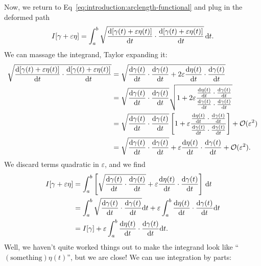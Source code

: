 Now, we return to Eq~\eqref{eq:introduction:arclength-functional} and
plug in the deformed path
\begin{equation}
  I[\gamma + \varepsilon\eta]
  = \int^{b}_{a}\sqrt{\frac{\mathrm{d}[\gamma(t)+ \varepsilon\eta(t)]}{\mathrm{d} t}\cdot\frac{\mathrm{d}[\gamma(t)+ \varepsilon\eta(t)]}{\mathrm{d} t}}\,\mathrm{d} t.
\end{equation}
We can massage the integrand, Taylor expanding it:
\begin{subequations}
  \begin{align}
\sqrt{\frac{\mathrm{d}[\gamma(t)+ \varepsilon\eta(t)]}{\mathrm{d} t}\cdot\frac{\mathrm{d}[\gamma(t)+ \varepsilon\eta(t)]}{\mathrm{d} t}}
&= \sqrt{\frac{\mathrm{d}\gamma(t)}{\mathrm{d} t}\cdot\frac{\mathrm{d}\gamma(t)}{\mathrm{d} t} + 2\varepsilon \frac{\mathrm{d}\eta(t)}{\mathrm{d} t}\cdot\frac{\mathrm{d}\gamma(t)}{\mathrm{d} t}}\\
&= \sqrt{\frac{\mathrm{d}\gamma(t)}{\mathrm{d} t}\cdot\frac{\mathrm{d}\gamma(t)}{\mathrm{d} t}}\sqrt{1 + 2\varepsilon \frac{\frac{\mathrm{d}\eta(t)}{\mathrm{d} t}\cdot\frac{\mathrm{d}\gamma(t)}{\mathrm{d} t}}{\frac{\mathrm{d}\gamma(t)}{\mathrm{d} t}\cdot\frac{\mathrm{d}\gamma(t)}{\mathrm{d} t}}}\\
&= \sqrt{\frac{\mathrm{d}\gamma(t)}{\mathrm{d} t}\cdot\frac{\mathrm{d}\gamma(t)}{\mathrm{d}
    t}}\left[1 + \varepsilon \frac{\frac{\mathrm{d}\eta(t)}{\mathrm{d} t}\cdot\frac{\mathrm{d}\gamma(t)}{\mathrm{d} t}}{\frac{\mathrm{d}\gamma(t)}{\mathrm{d} t}\cdot\frac{\mathrm{d}\gamma(t)}{\mathrm{d} t}}\right]
+\mathcal{O}(\varepsilon^{2})\\
&= \sqrt{\frac{\mathrm{d}\gamma(t)}{\mathrm{d} t}\cdot\frac{\mathrm{d}\gamma(t)}{\mathrm{d} t}} + \varepsilon \frac{\mathrm{d}\eta(t)}{\mathrm{d} t}\cdot\frac{\mathrm{d}\gamma(t)}{\mathrm{d} t} +\mathcal{O}(\varepsilon^{2}).
  \end{align}
\end{subequations}
We discard terms quadratic in $\varepsilon$, and we find
\begin{subequations}
  \begin{align}
I[\gamma + \varepsilon\eta] &= \int^{b}_{a} \left[\sqrt{\frac{\mathrm{d}\gamma(t)}{\mathrm{d} t}\cdot\frac{\mathrm{d}\gamma(t)}{\mathrm{d} t}} + \varepsilon \frac{\mathrm{d}\eta(t)}{\mathrm{d} t}\cdot\frac{\mathrm{d}\gamma(t)}{\mathrm{d} t}\right]\,
\mathrm{d} t\\
&= \int^{b}_{a} \sqrt{\frac{\mathrm{d}\gamma(t)}{\mathrm{d} t}\cdot\frac{\mathrm{d}\gamma(t)}{\mathrm{d} t}}\mathrm{d} t +
\varepsilon \int^{b}_{a} \frac{\mathrm{d}\eta(t)}{\mathrm{d} t}\cdot\frac{\mathrm{d}\gamma(t)}{\mathrm{d} t}\mathrm{d} t\\
&= I[\gamma] + \varepsilon \int^{b}_{a} \frac{\mathrm{d}\eta(t)}{\mathrm{d} t}\cdot\frac{\mathrm{d}\gamma(t)}{\mathrm{d} t}\mathrm{d} t.
  \end{align}
\end{subequations}
Well, we haven't quite worked things out to make the integrand look like
``$(\mbox{something})\eta(t)$'', but we are close! We can use
integration by parts:
